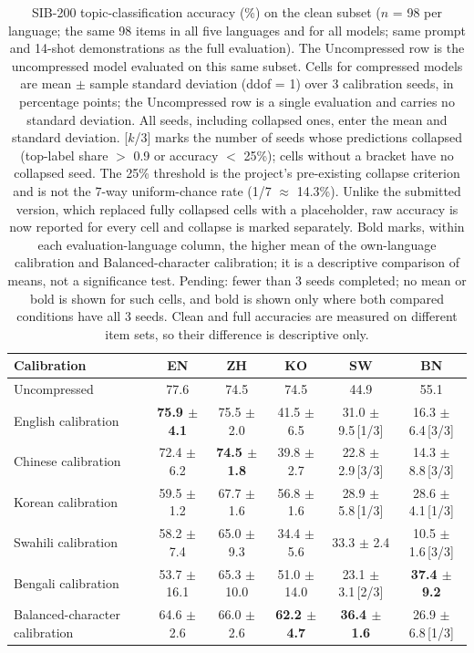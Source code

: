 \begin{table}[t]
\centering
\small
\begin{tabular}{lccccc}
\toprule
Calibration & EN & ZH & KO & SW & BN \\
\midrule
Uncompressed & 77.6 & 74.5 & 74.5 & 44.9 & 55.1 \\
\midrule
English calibration & \textbf{75.9 $\pm$ 4.1} & 75.5 $\pm$ 2.0 & 41.5 $\pm$ 6.5 & 31.0 $\pm$ 9.5\,[1/3] & 16.3 $\pm$ 6.4\,[3/3] \\
Chinese calibration & 72.4 $\pm$ 6.2 & \textbf{74.5 $\pm$ 1.8} & 39.8 $\pm$ 2.7 & 22.8 $\pm$ 2.9\,[3/3] & 14.3 $\pm$ 8.8\,[3/3] \\
Korean calibration & 59.5 $\pm$ 1.2 & 67.7 $\pm$ 1.6 & 56.8 $\pm$ 1.6 & 28.9 $\pm$ 5.8\,[1/3] & 28.6 $\pm$ 4.1\,[1/3] \\
Swahili calibration & 58.2 $\pm$ 7.4 & 65.0 $\pm$ 9.3 & 34.4 $\pm$ 5.6 & 33.3 $\pm$ 2.4 & 10.5 $\pm$ 1.6\,[3/3] \\
Bengali calibration & 53.7 $\pm$ 16.1 & 65.3 $\pm$ 10.0 & 51.0 $\pm$ 14.0 & 23.1 $\pm$ 3.1\,[2/3] & \textbf{37.4 $\pm$ 9.2} \\
Balanced-character calibration & 64.6 $\pm$ 2.6 & 66.0 $\pm$ 2.6 & \textbf{62.2 $\pm$ 4.7} & \textbf{36.4 $\pm$ 1.6} & 26.9 $\pm$ 6.8\,[1/3] \\
\bottomrule
\end{tabular}
\caption{SIB-200 topic-classification accuracy (\%) on the clean subset ($n$ = 98 per language; the same 98 items in all five languages and for all models; same prompt and 14-shot demonstrations as the full evaluation). The Uncompressed row is the uncompressed model evaluated on this same subset. Cells for compressed models are mean $\pm$ sample standard deviation (ddof = 1) over 3 calibration seeds, in percentage points; the Uncompressed row is a single evaluation and carries no standard deviation. All seeds, including collapsed ones, enter the mean and standard deviation. [$k$/3] marks the number of seeds whose predictions collapsed (top-label share $>$ 0.9 or accuracy $<$ 25\%); cells without a bracket have no collapsed seed. The 25\% threshold is the project's pre-existing collapse criterion and is not the 7-way uniform-chance rate (1/7 $\approx$ 14.3\%). Unlike the submitted version, which replaced fully collapsed cells with a placeholder, raw accuracy is now reported for every cell and collapse is marked separately. Bold marks, within each evaluation-language column, the higher mean of the own-language calibration and Balanced-character calibration; it is a descriptive comparison of means, not a significance test. Pending: fewer than 3 seeds completed; no mean or bold is shown for such cells, and bold is shown only where both compared conditions have all 3 seeds. Clean and full accuracies are measured on different item sets, so their difference is descriptive only.}
\label{tab:sib-acc-clean}
\end{table}
